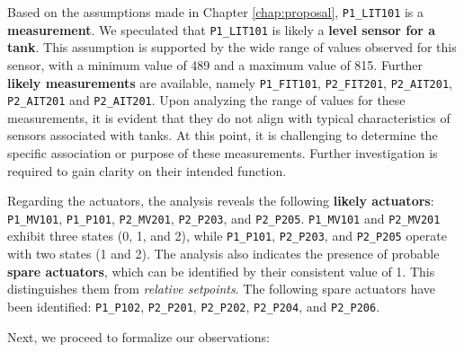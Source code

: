 Based on the assumptions made in Chapter \ref{chap:proposal}, \texttt{P1\_LIT101} is a \textbf{measurement}. We speculated that \texttt{P1\_LIT101} is likely a \textbf{level sensor for a tank}. This assumption is supported by the wide range of values observed for this sensor, with a minimum value of 489 and a maximum value of 815.
Further \textbf{likely measurements} are available, namely \texttt{P1\_FIT101}, \texttt{P2\_FIT201}, \texttt{P2\_AIT201}, \texttt{P2\_AIT201} and \texttt{P2\_AIT201}. Upon analyzing the range of values for these measurements, it is evident that they do not align with typical characteristics of sensors associated with tanks. At this point, it is challenging to determine the specific association or purpose of these measurements. Further investigation is required to gain clarity on their intended function.

\bigskip
Regarding the actuators, the analysis reveals the following \textbf{likely actuators}: \texttt{P1\_MV101}, \texttt{P1\_P101}, \texttt{P2\_MV201}, \texttt{P2\_P203}, and \texttt{P2\_P205}.\newline
\texttt{P1\_MV101} and \texttt{P2\_MV201} exhibit three states (0, 1, and 2), while \texttt{P1\_P101}, \texttt{P2\_P203}, and \texttt{P2\_P205} operate with two states (1 and 2).\newline
The analysis also indicates the presence of probable \textbf{spare actuators}, which can be identified by their consistent value of 1. This distinguishes them from \textit{relative setpoints}.\newline 
The following spare actuators have been identified: \texttt{P1\_P102}, \texttt{P2\_P201}, \texttt{P2\_P202}, \texttt{P2\_P204}, and \texttt{P2\_P206}.

\noindent Next, we proceed to formalize our observations:

